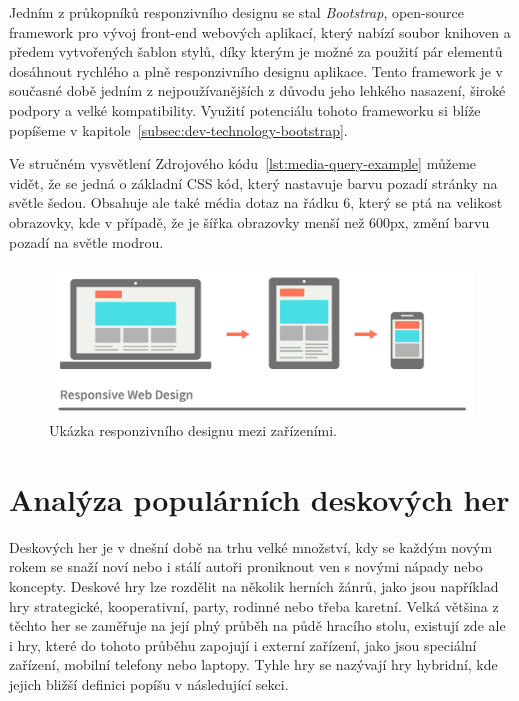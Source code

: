 Jedním z průkopníků responzivního designu se stal \textit{Bootstrap}, open-source framework pro vývoj front-end webových aplikací, který nabízí soubor knihoven a předem vytvořených šablon stylů, díky kterým je možné za použití pár elementů dosáhnout rychlého a plně responzivního designu aplikace. Tento framework je v současné době jedním z nejpoužívanějších z důvodu jeho lehkého nasazení, široké podpory a velké kompatibility. Využití potenciálu tohoto frameworku si blíže popíšeme v kapitole~\ref{subsec:dev-technology-bootstrap}.



Ve stručném vysvětlení Zdrojového kódu~\ref{lst:media-query-example} můžeme vidět, že se jedná o základní CSS kód, který nastavuje barvu pozadí stránky na světle šedou. Obsahuje ale také média dotaz na řádku 6, který se ptá na velikost obrazovky, kde v případě, že je šířka obrazovky menší než 600px, změní barvu pozadí na světle modrou.

\begin{figure}[H]
    \centering
    \includegraphics[width=1.0\textwidth]{figures/responsiveDesign}
    \caption{Ukázka responzivního designu mezi zařízeními. \cite{responsive_design}}
    \label{fig:responsive-design-example}
\end{figure}

\section{Analýza populárních deskových her}
\label{sec:popular-board-games-analysis}
Deskových her je v dnešní době na trhu velké množství, kdy se každým novým rokem se snaží noví nebo i stálí autoři proniknout ven s novými nápady nebo koncepty. Deskové hry lze rozdělit na několik herních žánrů, jako jsou například hry strategické, kooperativní, party, rodinné nebo třeba karetní. Velká většina z těchto her se zaměřuje na její plný průběh na půdě hracího stolu, existují zde ale i hry, které do tohoto průběhu zapojují i externí zařízení, jako jsou speciální zařízení, mobilní telefony nebo laptopy. Tyhle hry se nazývají hry hybridní, kde jejich bližší definici popíšu v následující sekci.

